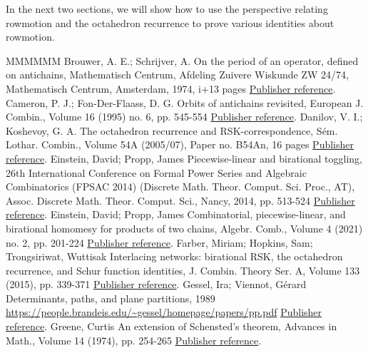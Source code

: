 \documentclass[11pt]{article}
\theoremstyle{definition}
\numberwithin{equation}{section}
\numberwithin{equation}{section}
\begin{document}
In the next two sections, we will show how to use the perspective relating rowmotion and the octahedron recurrence to prove various identities about rowmotion.
\begin{thebibliography}{MMMMMM}
 Brouwer, A. E.; Schrijver, A. On the period of an operator, defined on antichains, Mathematisch Centrum, Afdeling Zuivere Wiskunde ZW 24/74, Mathematisch Centrum, Amsterdam, 1974, i+13 pages \href{https://alco.centre-mersenne.org/articles/10.5802/alco.385/#brouwerschrijver}{Publisher reference}.
 Cameron, P. J.; Fon-Der-Flaass, D. G. Orbits of antichains revisited, European J. Combin., Volume 16 (1995) no. 6, pp. 545-554 \href{https://alco.centre-mersenne.org/articles/10.5802/alco.385/#cameronfonderflaass}{Publisher reference}.
 Danilov, V. I.; Koshevoy, G. A. The octahedron recurrence and RSK-correspondence, Sém. Lothar. Combin., Volume 54A (2005/07), Paper no. B54An, 16 pages \href{https://alco.centre-mersenne.org/articles/10.5802/alco.385/#danilovkoshevoy}{Publisher reference}.
 Einstein, David; Propp, James Piecewise-linear and birational toggling, 26th International Conference on Formal Power Series and Algebraic Combinatorics (FPSAC 2014) (Discrete Math. Theor. Comput. Sci. Proc., AT), Assoc. Discrete Math. Theor. Comput. Sci., Nancy, 2014, pp. 513-524 \href{https://alco.centre-mersenne.org/articles/10.5802/alco.385/#einsteinpropp2}{Publisher reference}.
 Einstein, David; Propp, James Combinatorial, piecewise-linear, and birational homomesy for products of two chains, Algebr. Comb., Volume 4 (2021) no. 2, pp. 201-224 \href{https://alco.centre-mersenne.org/articles/10.5802/alco.385/#einsteinpropp1}{Publisher reference}.
 Farber, Miriam; Hopkins, Sam; Trongsiriwat, Wuttisak Interlacing networks: birational RSK, the octahedron recurrence, and Schur function identities, J. Combin. Theory Ser. A, Volume 133 (2015), pp. 339-371 \href{https://alco.centre-mersenne.org/articles/10.5802/alco.385/#farberhopkinstrongsiriwat}{Publisher reference}.
 Gessel, Ira; Viennot, Gérard Determinants, paths, and plane partitions, 1989 \url{https://people.brandeis.edu/~gessel/homepage/papers/pp.pdf} \href{https://alco.centre-mersenne.org/articles/10.5802/alco.385/#gesselviennot}{Publisher reference}.
 Greene, Curtis An extension of Schensted’s theorem, Advances in Math., Volume 14 (1974), pp. 254-265 \href{https://alco.centre-mersenne.org/articles/10.5802/alco.385/#greene}{Publisher reference}.

\end{thebibliography}
\end{document}
